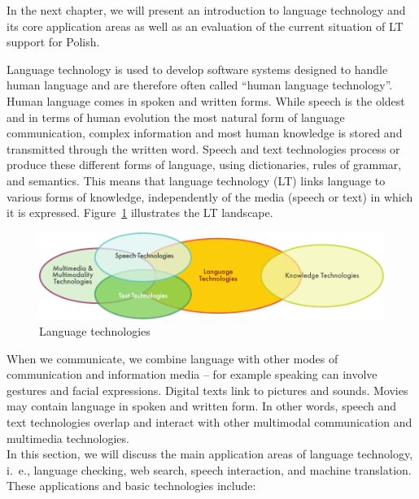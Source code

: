 \begin{multicols}{2}
In the next chapter, we will present an introduction to language
technology and its core application areas as well as an evaluation of
the current situation of LT support for Polish. 

\end{multicols} 

\clearpage 


\begin{multicols}{2} 

Language technology is used to develop software systems designed to
handle human language and are therefore often called “human language
technology”. Human language comes in spoken and written forms. While
speech is the oldest and in terms of human evolution the most natural
form of language communication, complex information and most human
knowledge is stored and transmitted through the written word. Speech
and text technologies process or produce these different forms of
language, using dictionaries, rules of grammar, and semantics. This
means that language technology (LT) links language to various forms of
knowledge, independently of the media (speech or text) in which it is
expressed. Figure~\ref{fig:ltincontext_en} illustrates the LT
landscape. 

\begin{figure}[htb]  \center
\includegraphics[width=\textwidth]{../_media/english/language_technologies}
\caption{Language technologies} \label{fig:ltincontext_en}
 \end{figure} 

When we communicate, we combine language with other modes of
communication and information media -- for example speaking can
involve gestures and facial expressions. Digital texts link to
pictures and sounds. Movies may contain language in spoken and written
form. In other words, speech and text technologies overlap and
interact with other multimodal communication and multimedia
technologies.\\
In this section, we will discuss the main application areas of
language technology, i.\, e., language checking, web search, speech
interaction, and machine translation. These applications and basic
technologies include: 


\end{multicols}
